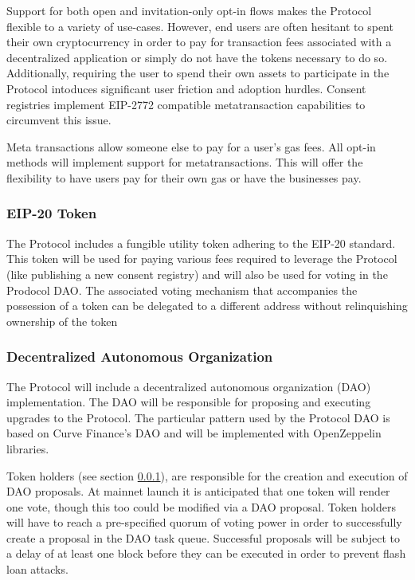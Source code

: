 Support for both open and invitation-only opt-in flows makes the Protocol flexible to a variety of use-cases. However, end users are often hesitant to 
spent their own cryptocurrency in order to pay for transaction fees associated with a decentralized application or simply do not have the tokens 
necessary to do so. Additionally, requiring the user to spend their own assets to participate in the Protocol intoduces significant user friction and
adoption hurdles. Consent registries implement EIP-2772 compatible metatransaction capabilities to circumvent this issue. 

Meta transactions allow someone else to pay for a user's gas fees. All opt-in methods will implement support for metatransactions. This will offer the 
flexibility to have users pay for their own gas or have the businesses pay.  

\subsubsection{EIP-20 Token}
\label{section:Token}
The Protocol includes a fungible utility token adhering to the EIP-20 standard. This token will be used for paying various fees required to leverage
the Protocol (like publishing a new consent registry) and will also be used for voting in the Prodocol DAO. The associated voting mechanism that 
accompanies the possession of a token can be delegated to a different address without relinquishing ownership of the token

\subsubsection{Decentralized Autonomous Organization}
\label{section:ImplementationDAO}

The Protocol will include a decentralized autonomous organization (DAO) implementation. The DAO will be responsible for proposing and executing upgrades to 
the Protocol. The particular pattern used by the Protocol DAO is based on Curve Finance's DAO and will be implemented with OpenZeppelin libraries. 

Token holders (see section \ref{section:Token}), are responsible for the creation and execution of DAO proposals. At mainnet launch it is anticipated that one 
token will render one vote, though this too could be modified via a DAO proposal. Token holders will have to reach a pre-specified quorum of voting power in 
order to successfully create a proposal in the DAO task queue. Successful proposals will be subject to a delay of at least one block before they can be executed 
in order to prevent flash loan attacks. 

